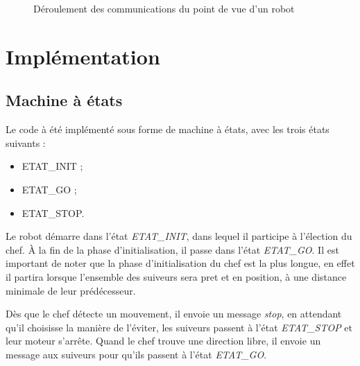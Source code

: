 \documentclass[a4paper,12pt]{article}
\begin{document}
\begin{figure}[!h]
        \caption{Déroulement des communications du point de vue d'un robot}
        \label{fig:Comm}
\end{figure}

\section{Implémentation}
\subsection{Machine à états}
Le code à été implémenté sous forme de machine à états, avec les trois états suivants :
\begin{itemize}
        \item ETAT\_INIT ;
        \item ETAT\_GO ;
        \item ETAT\_STOP.
\end{itemize}

Le robot démarre dans l'état \textit{ETAT\_INIT}, dans lequel il participe à l'élection du chef. À la fin de la phase d'initialisation, il passe dans l'état \textit{ETAT\_GO}.
Il est important de noter que la phase d'initialisation du chef est la plus longue, en effet il partira lorsque l'ensemble des suiveurs sera pret et en position, à une distance minimale de leur prédécesseur.

Dès que le chef détecte un mouvement, il envoie un message \textit{stop}, en attendant qu'il choisisse la manière de l'éviter, les suiveurs passent à l'état \textit{ETAT\_STOP} et leur moteur s'arrête.
Quand le chef trouve une direction libre, il envoie un message aux suiveurs pour qu'ils passent à l'état \textit{ETAT\_GO}.
\end{document}
